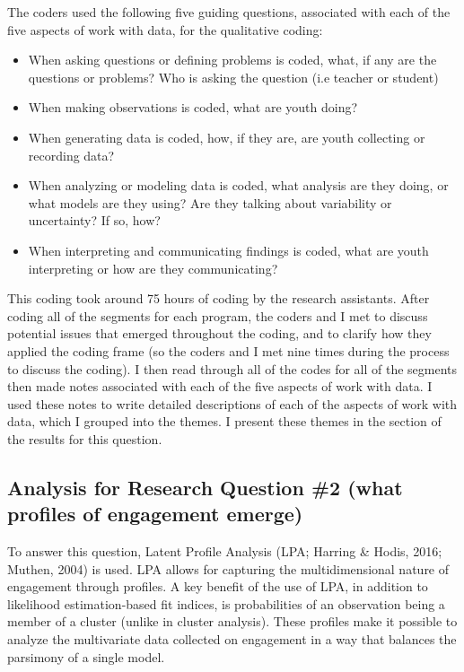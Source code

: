 \documentclass[]{msu-thesis}
\providecommand{\tightlist}{%
  \setlength{\itemsep}{0pt}\setlength{\parskip}{0pt}}
\theoremstyle{definition}
\theoremstyle{definition}
\theoremstyle{definition}
\theoremstyle{remark}
\begin{document}
The coders used the following five guiding questions, associated with
each of the five aspects of work with data, for the qualitative coding:

\begin{itemize}
\tightlist
\item
  When asking questions or defining problems is coded, what, if any are
  the questions or problems? Who is asking the question (i.e teacher or
  student)
\item
  When making observations is coded, what are youth doing?
\item
  When generating data is coded, how, if they are, are youth collecting
  or recording data?
\item
  When analyzing or modeling data is coded, what analysis are they
  doing, or what models are they using? Are they talking about
  variability or uncertainty? If so, how?
\item
  When interpreting and communicating findings is coded, what are youth
  interpreting or how are they communicating?
\end{itemize}

This coding took around 75 hours of coding by the research assistants.
After coding all of the segments for each program, the coders and I met
to discuss potential issues that emerged throughout the coding, and to
clarify how they applied the coding frame (so the coders and I met nine
times during the process to discuss the coding). I then read through all
of the codes for all of the segments then made notes associated with
each of the five aspects of work with data. I used these notes to write
detailed descriptions of each of the aspects of work with data, which I
grouped into the themes. I present these themes in the section of the
results for this question.

\subsection{Analysis for Research Question \#2 (what profiles of
engagement
emerge)}\label{analysis-for-research-question-2-what-profiles-of-engagement-emerge}

To answer this question, Latent Profile Analysis (LPA; Harring \& Hodis,
2016; Muthen, 2004) is used. LPA allows for capturing the
multidimensional nature of engagement through profiles. A key benefit of
the use of LPA, in addition to likelihood estimation-based fit indices,
is probabilities of an observation being a member of a cluster (unlike
in cluster analysis). These profiles make it possible to analyze the
multivariate data collected on engagement in a way that balances the
parsimony of a single model.
\end{document}
